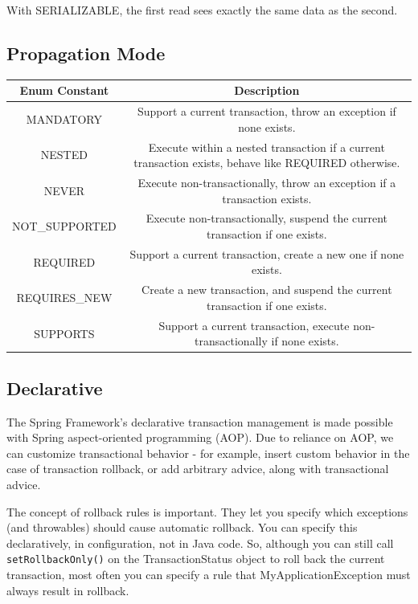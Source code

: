 \documentclass{scrartcl}
\begin{document}
With SERIALIZABLE, the first read sees exactly the same data as the second.

\subsection{Propagation Mode}

\begin{tabular}{|c|c|}
    \hline
    Enum Constant& Description \\
    \hline
    MANDATORY&  Support a current transaction, throw an exception if none exists.\\
    \hline
    NESTED&  Execute within a nested transaction if a current transaction exists, behave like REQUIRED otherwise.\\
    \hline
    NEVER &  Execute non-transactionally, throw an exception if a transaction exists.\\
    \hline
    NOT\_SUPPORTED& Execute non-transactionally, suspend the current transaction if one exists.\\
    \hline
    REQUIRED &  Support a current transaction, create a new one if none exists.\\
    \hline
    REQUIRES\_NEW &  Create a new transaction, and suspend the current transaction if one exists.\\
    \hline
    SUPPORTS&  Support a current transaction, execute non-transactionally if none exists.\\
    \hline
\end{tabular}

\subsection{Declarative}

The Spring Framework’s declarative transaction management is made possible with Spring aspect-oriented programming (AOP). Due to reliance on AOP, we can customize transactional behavior - for example, insert custom behavior in the case of transaction rollback, or add arbitrary advice, along with transactional advice.

The concept of rollback rules is important. They let you specify which exceptions (and throwables) should cause automatic rollback. You can specify this declaratively, in configuration, not in Java code. So, although you can still call \lstinline|setRollbackOnly()| on the TransactionStatus object to roll back the current transaction, most often you can specify a rule that MyApplicationException must always result in rollback.
\end{document}
